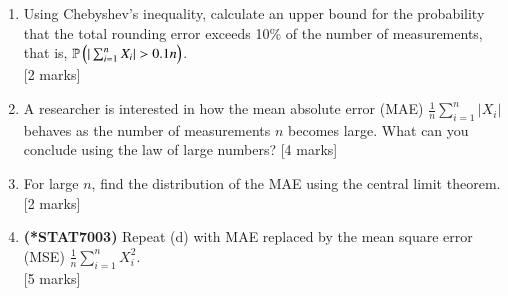 \documentclass[12pt]{article}
\begin{document}
\begin{enumerate}
\begin{enumerate}
\item Using Chebyshev's inequality, calculate an upper bound for the probability that the total rounding error exceeds 10\% of the number of measurements, that is, ${\mathbb P}\left(|\sum_{i=1}^n X_i| > 0.1 n\right)$. 
			\\\phantom{1}\hfill [2 marks]
%
\item A researcher is interested in how the mean absolute error (MAE) $\frac{1}{n} \sum_{i=1}^n |X_i|$ behaves as the number of measurements $n$ becomes large. What can you conclude using the law of large numbers?
			\hfill [4 marks]
%
\item For large $n$, find the distribution of the MAE using the central limit theorem. 
			\hfill [2 marks]
%
\item 
{\bf (*STAT7003)} Repeat (d) with MAE replaced by the mean square error (MSE) $\frac{1}{n} \sum_{i=1}^n X_i^2$. 
			\\\phantom{1}\hfill [5 marks]
%
\end{enumerate}


\end{enumerate}
\end{document}
